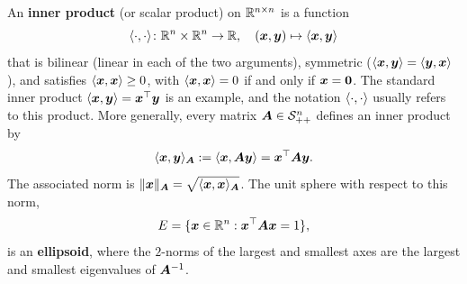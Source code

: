 \documentclass[11pt,a4paper]{memoir}
\begin{document}
An \textbf{inner product} (or scalar product) on $\mathbb{R}^{n\times n}$ is a function 
\begin{equation*}
 \langle {\cdot}, {\cdot} \rangle\colon \mathbb{R}^n\times \mathbb{R}^n \to \mathbb{R}, \quad (\bm{x},\bm{y}) \mapsto \langle {\bm{x}}, {\bm{y}} \rangle
\end{equation*}
that is bilinear (linear in each of the two arguments), symmetric ($\langle {\bm{x}}, {\bm{y}} \rangle=\langle {\bm{y}}, {\bm{x}} \rangle$), and satisfies $\langle {\bm{x}}, {\bm{x}} \rangle\geq 0$, with $\langle {\bm{x}}, {\bm{x}} \rangle=0$ if and only if $\bm{x}=\bm{0}$. The standard inner product $\langle {\bm{x}}, {\bm{y}} \rangle=\bm{x}^{\top}\bm{y}$ is an example, and the notation $\langle {\cdot}, {\cdot} \rangle$ usually refers to this product. More generally, every matrix $\bm{A}\in \mathcal{S}_{++}^n$ defines an inner product by
\begin{equation*}
 \langle {\bm{x}}, {\bm{y}} \rangle_{\bm{A}} := \langle {\bm{x}}, {\bm{A}\bm{y}} \rangle = \bm{x}^{\top}\bm{A}\bm{y}.
\end{equation*}
The associated norm is $\Vert {\bm{x}}\Vert_{\bm{A}}=\sqrt{\langle {\bm{x}}, {\bm{x}} \rangle_{\bm{A}}}$. The unit sphere with respect to this norm,
\begin{equation*}
 E = \{\bm{x}\in \mathbb{R}^n \mathrel{\mathop{:}} \bm{x}^{\top}\bm{A}\bm{x}=1\},
\end{equation*}
is an \textbf{ellipsoid}, where the $2$-norms of the largest and smallest axes are the largest and smallest eigenvalues of $\bm{A}^{-1}$. 
\end{document}
